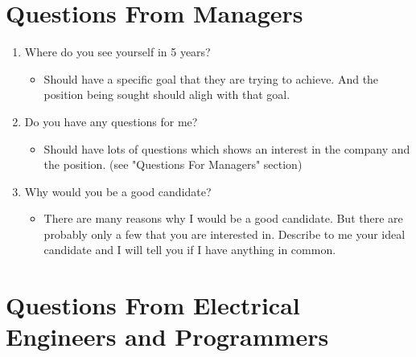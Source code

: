 \documentclass{article}
\begin{document}
\section{Questions From Managers}

\begin{enumerate}

\item Where do you see yourself in 5 years?
	\begin{itemize}
	\item Should have a specific goal that they are trying to achieve.
		And the position being sought should aligh with that goal.
	\end{itemize}

\item Do you have any questions for me?
	\begin{itemize}
	\item Should have lots of questions which shows an interest in the
		company and the position.  (see "Questions For Managers"
		section)
	\end{itemize}

\item Why would you be a good candidate?
	\begin{itemize}
	\item There are many reasons why I would be a good candidate.
	But there are probably only a few that you are interested in.
	Describe to me your ideal candidate and I will tell you if I have
	anything in common.
	\end{itemize}

\end{enumerate}

\section{Questions From Electrical Engineers and Programmers}
\end{document}
